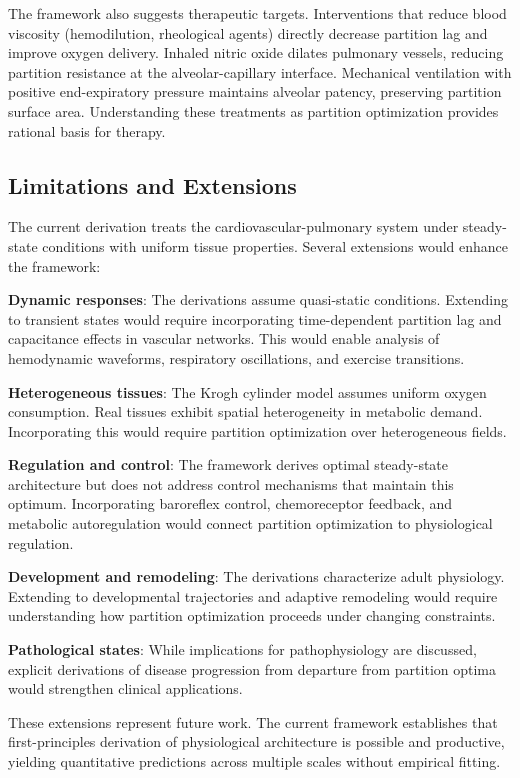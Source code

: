 \documentclass[12pt,a4paper]{article}
\theoremstyle{remark}
\begin{document}
The framework also suggests therapeutic targets. Interventions that reduce blood viscosity (hemodilution, rheological agents) directly decrease partition lag and improve oxygen delivery. Inhaled nitric oxide dilates pulmonary vessels, reducing partition resistance at the alveolar-capillary interface. Mechanical ventilation with positive end-expiratory pressure maintains alveolar patency, preserving partition surface area. Understanding these treatments as partition optimization provides rational basis for therapy.

\subsection{Limitations and Extensions}

The current derivation treats the cardiovascular-pulmonary system under steady-state conditions with uniform tissue properties. Several extensions would enhance the framework:

\textbf{Dynamic responses}: The derivations assume quasi-static conditions. Extending to transient states would require incorporating time-dependent partition lag and capacitance effects in vascular networks. This would enable analysis of hemodynamic waveforms, respiratory oscillations, and exercise transitions.

\textbf{Heterogeneous tissues}: The Krogh cylinder model assumes uniform oxygen consumption. Real tissues exhibit spatial heterogeneity in metabolic demand. Incorporating this would require partition optimization over heterogeneous fields.

\textbf{Regulation and control}: The framework derives optimal steady-state architecture but does not address control mechanisms that maintain this optimum. Incorporating baroreflex control, chemoreceptor feedback, and metabolic autoregulation would connect partition optimization to physiological regulation.

\textbf{Development and remodeling}: The derivations characterize adult physiology. Extending to developmental trajectories and adaptive remodeling would require understanding how partition optimization proceeds under changing constraints.

\textbf{Pathological states}: While implications for pathophysiology are discussed, explicit derivations of disease progression from departure from partition optima would strengthen clinical applications.

These extensions represent future work. The current framework establishes that first-principles derivation of physiological architecture is possible and productive, yielding quantitative predictions across multiple scales without empirical fitting.
\end{document}

